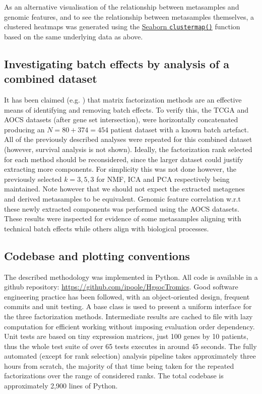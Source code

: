 \documentclass[tikz, 12pt,a4paper,oneside,fleqn]{article}
\begin{document}
As an alternative visualisation of the relationship between metasamples and genomic features, and to see the relationship between metasamples themselves, a clustered heatmaps was generated using the \href{https://seaborn.pydata.org/generated/seaborn.clustermap.html}{Seaborn {\tt clustermap()}} function based on the same underlying data as above.  

\subsection{Investigating batch effects by analysis of a combined dataset}

It has been claimed (e.g. \cite{Stein-OBrien2018,Renard2016}) that matrix factorization methods are an effective means of identifying and removing batch effects.  To verify this, the TCGA and AOCS datasets (after gene set intersection), were horizontally concatenated producing an $N=80+374=454$ patient dataset with a known batch artefact.  All of the previously described analyses were repeated for this combined dataset (however, survival analysis is not shown).  Ideally, the factorization rank selected for each method should be reconsidered, since the larger dataset could justify extracting more components.  For simplicity this was not done however, the previously selected $k = 3,5,3$ for NMF, ICA and PCA respectively being maintained.   Note however that we should not expect the extracted metagenes and derived metasamples to be equivalent. Genomic feature correlation w.r.t these newly extracted components was performed using the AOCS datasets.  These results were inspected for evidence of some metasamples aligning with technical batch effects while others align with biological processes.

\subsection{Codebase and plotting conventions}

The described methodology was implemented in Python.
All code is available in a github repository: \url{https://github.com/ipoole/HgsocTromics}.  Good software engineering practice has been followed, with an object-oriented design, frequent commits and unit testing.  A base class is used to present a uniform interface for the three factorization methods.  Intermediate results are cached to file with lazy computation for efficient working without imposing evaluation order dependency.  Unit tests are based on tiny expression matrices, just 100 genes by 10 patients, thus the whole test suite of over 65 tests executes in around 45 seconds.   The fully automated (except for rank selection) analysis pipeline takes approximately three hours from scratch, the majority of that time being taken for the repeated factorizations over the range of considered ranks.  The total codebase is approximately 2,900 lines of Python.  
\end{document}
